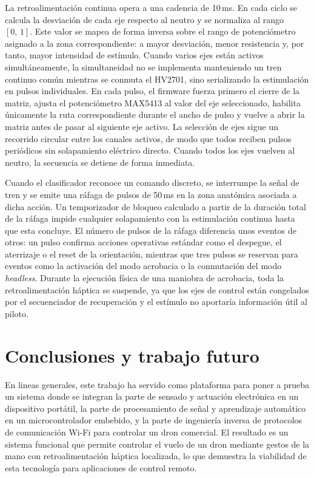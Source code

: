 \documentclass[12pt]{article}
\begin{document}
La retroalimentación continua opera a una cadencia de 10\,ms. En cada ciclo se calcula la desviación de cada eje respecto al neutro y se normaliza al rango $[0,\,1]$. Este valor se mapea de forma inversa sobre el rango de potenciómetro asignado a la zona correspondiente: a mayor desviación, menor resistencia y, por tanto, mayor intensidad de estímulo. Cuando varios ejes están activos simultáneamente, la simultaneidad no se implementa manteniendo un tren continuo común mientras se conmuta el HV2701, sino serializando la estimulación en pulsos individuales. En cada pulso, el firmware fuerza primero el cierre de la matriz, ajusta el potenciómetro MAX5413 al valor del eje seleccionado, habilita únicamente la ruta correspondiente durante el ancho de pulso y vuelve a abrir la matriz antes de pasar al siguiente eje activo. La selección de ejes sigue un recorrido circular entre los canales activos, de modo que todos reciben pulsos periódicos sin solapamiento eléctrico directo. Cuando todos los ejes vuelven al neutro, la secuencia se detiene de forma inmediata.

Cuando el clasificador reconoce un comando discreto, se interrumpe la señal de tren y se emite una ráfaga de pulsos de 50\,ms en la zona anatómica asociada a dicha acción. Un temporizador de bloqueo calculado a partir de la duración total de la ráfaga impide cualquier solapamiento con la estimulación continua hasta que esta concluye. El número de pulsos de la ráfaga diferencia unos eventos de otros: un pulso confirma acciones operativas estándar como el despegue, el aterrizaje o el reset de la orientación, mientras que tres pulsos se reservan para eventos como la activación del modo acrobacia o la conmutación del modo \textit{headless}. Durante la ejecución física de una maniobra de acrobacia, toda la retroalimentación háptica se suspende, ya que los ejes de control están congelados por el secuenciador de recuperación y el estímulo no aportaría información útil al piloto.

\section{Conclusiones y trabajo futuro}
\label{sec:conclusiones}

En lineas generales, este trabajo ha servido como plataforma para poner a prueba un sistema donde se integran la parte de sensado y actuación electrónica en un dispositivo portátil, la parte de procesamiento de señal y aprendizaje automático en un microcontrolador embebido, y la parte de ingeniería inversa de protocolos de comunicación Wi-Fi para controlar un dron comercial. El resultado es un sistema funcional que permite controlar el vuelo de un dron mediante gestos de la mano con retroalimentación háptica localizada, lo que demuestra la viabilidad de esta tecnología para aplicaciones de control remoto.
\end{document}
